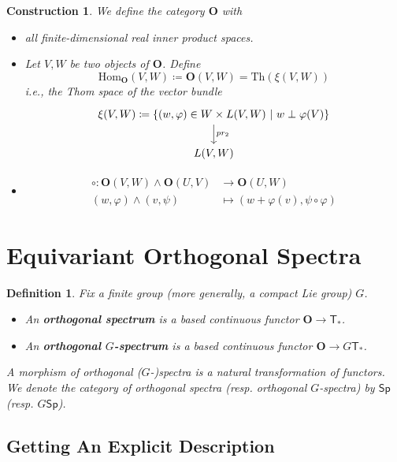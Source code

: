 \documentclass{scrartcl}
\newcommand{\textbi}[1]{\textbf{\textit{#1}}}
\newcommand{\bfO}{\mathbf{O}}
\newcommand{\Hom}{\mathrm{Hom}}
\newtheorem{defin}[subsection]{Definition}
\newtheorem{cons}[subsection]{Construction}
\begin{document}
\begin{cons}
    We define the category $\mathbf{O}$ with
    \begin{itemize}
        \item[Objects:] all finite-dimensional real inner product spaces.
        \item[Morphisms:] Let $V,W$ be two objects of $\bfO$. Define $$\Hom_{\bfO}(V,W)\coloneqq \bfO(V,W)=\text{Th}(\xi(V,W))$$ i.e., the Thom space of the vector bundle 
        \[\begin{tikzcd}
            \xi(V,W)\coloneqq \{(w,\varphi)\in W\times L(V,W)\ |\ w\perp\varphi(V)\} \arrow[d, "pr_2"] \\
            L(V,W)
        \end{tikzcd}\]
        \item[Composition:] 
        \begin{align*}
            \circ: \bfO(V,W)\wedge \bfO(U,V)&\to \bfO(U,W) \\
            (w,\varphi)\wedge (v,\psi) &\mapsto (w+\varphi(v), \psi\circ\varphi)
        \end{align*}
    \end{itemize} 
\end{cons}

\section{Equivariant Orthogonal Spectra}

\begin{defin}
    Fix a finite group (more generally, a compact Lie group) $G$.
    \begin{itemize}
        \item An \textbi{orthogonal spectrum} is a based continuous functor $\bfO\to \mathsf{T}_*$.
        \item An \textbi{orthogonal $G$-spectrum} is a based continuous functor $\bfO\to G\mathsf{T}_*$. 
    \end{itemize}
    A morphism of orthogonal ($G$-)spectra is a natural transformation of functors. We denote the category of orthogonal spectra (resp. orthogonal $G$-spectra) by $\mathsf{Sp}$ (resp. $G\mathsf{Sp}$).
\end{defin}

\subsection*{Getting An Explicit Description}
\end{document}
